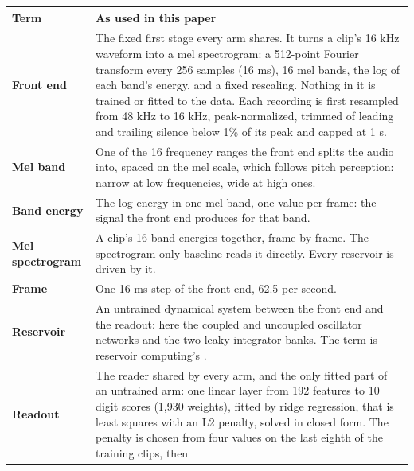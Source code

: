 \documentclass{article}
\begin{document}
{\def\LTcaptype{none} %
\begin{longtable}[]{@{}
  >{\raggedright\arraybackslash}p{}
  >{\raggedright\arraybackslash}p{}@{}}
\toprule\noalign{}
\begin{minipage}[b]{\linewidth}\raggedright
Term
\end{minipage} & \begin{minipage}[b]{\linewidth}\raggedright
As used in this paper
\end{minipage} \\
\midrule\noalign{}
\endhead
\bottomrule\noalign{}
\endlastfoot
\textbf{Front end} & The fixed first stage every arm shares. It turns a
clip's 16 kHz waveform into a mel spectrogram: a 512-point Fourier
transform every 256 samples (16 ms), 16 mel bands, the log of each
band's energy, and a fixed rescaling. Nothing in it is trained or fitted
to the data. Each recording is first resampled from 48 kHz to 16 kHz,
peak-normalized, trimmed of leading and trailing silence below 1\% of
its peak and capped at 1 s. \\
\cmidrule{1-2}\textbf{Mel band} & One of the 16 frequency ranges the
front end splits the audio into, spaced on the mel scale, which follows
pitch perception: narrow at low frequencies, wide at high ones. \\
\cmidrule{1-2}\textbf{Band energy} & The log energy in one mel band, one
value per frame: the signal the front end produces for that band. \\
\cmidrule{1-2}\textbf{Mel spectrogram} & A clip's 16 band energies
together, frame by frame. The spectrogram-only baseline reads it
directly. Every reservoir is driven by it. \\
\cmidrule{1-2}\textbf{Frame} & One 16 ms step of the front end, 62.5 per
second. \\
\cmidrule{1-2}\textbf{Reservoir} & An untrained dynamical system between
the front end and the readout: here the coupled and uncoupled oscillator
networks and the two leaky-integrator banks. The term is reservoir
computing's \citep{jaeger2001, maass2002}. \\
\cmidrule{1-2}\textbf{Readout} & The reader shared by every arm, and the
only fitted part of an untrained arm: one linear layer from 192 features
to 10 digit scores (1,930 weights), fitted by ridge regression, that is
least squares with an L2 penalty, solved in closed form. The penalty is
chosen from four values on the last eighth of the training clips, then

\end{longtable}}
\end{document}
